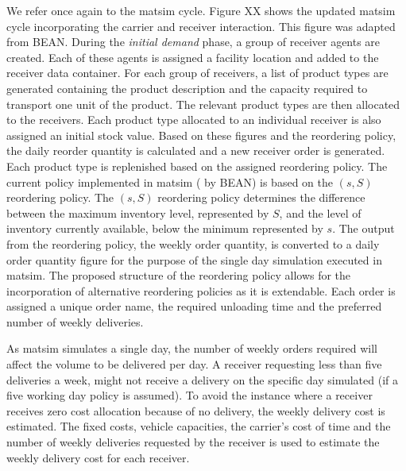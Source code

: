 We refer once again to the \acrshort{matsim} cycle. Figure XX shows the updated \acrshort{matsim} cycle incorporating the carrier and receiver interaction. This figure was adapted from BEAN.
During the \textit{initial demand} phase, a group of receiver agents are created. Each of these agents is assigned a facility location and added to the receiver data container. For each group of receivers, a list of product types are generated containing the product description and the capacity required to transport one unit of the product. The relevant product types are then allocated to the receivers. Each product type allocated to an individual receiver is also assigned an initial stock value. Based on these figures and the reordering policy, the daily reorder quantity is calculated and a new receiver order is generated. Each product type is replenished based on the assigned reordering policy. The current policy implemented in \acrshort{matsim} ( by BEAN) is based on the \((s,S)\) reordering policy. The \((s,S)\) reordering policy determines the difference between the maximum inventory level, represented by \(S\), and the level of inventory currently available, below the minimum represented by \(s\). The output from the reordering policy, the weekly order quantity, is converted to a daily order quantity figure for the purpose of the single day simulation executed in \acrshort{matsim}. The proposed structure of the reordering policy allows for the incorporation of alternative reordering policies as it is extendable. Each order is assigned a unique order name, the required unloading time and the preferred number of weekly deliveries.\par

As \acrshort{matsim} simulates a single day, the number of weekly orders required will affect the volume to be delivered per day. A receiver requesting less than five deliveries a week, might not receive a delivery on the specific day simulated (if a five working day policy is assumed). To avoid the instance where a receiver receives zero cost allocation because of no delivery, the weekly delivery cost is estimated. The fixed costs, vehicle capacities, the carrier's cost of time and the number of weekly deliveries requested by the receiver is used to estimate the weekly delivery cost for each receiver.\par

